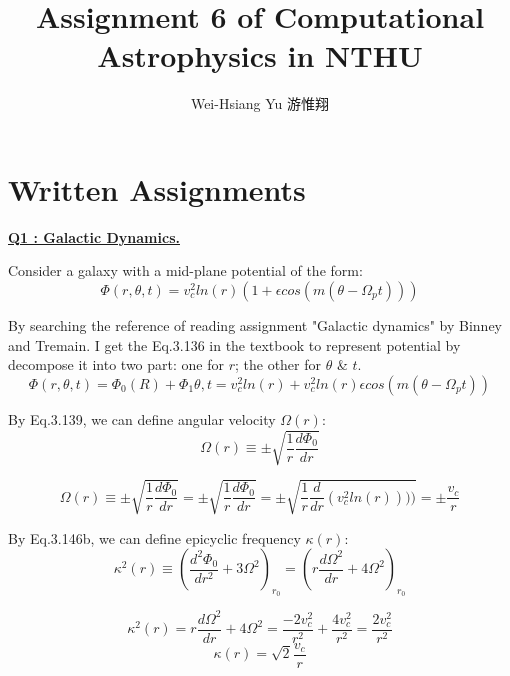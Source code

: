\documentclass{article}
\title{Assignment 6 of Computational Astrophysics in NTHU}
\author{Wei-Hsiang Yu 游惟翔}
\begin{document}
\begin{CJK}{UTF8}{bsmi}
\maketitle
\end{CJK}


\section{Written Assignments}
\underline{\textbf{Q1 : Galactic Dynamics.}}

Consider a galaxy with a mid-plane potential of the form:
\begin{equation}
    \Phi (r,\theta ,t)=v_{c}^{2}ln(r)(1+\epsilon cos(m(\theta -\Omega_{p}t )))
    \label{eq:potential}
\end{equation}

By searching the reference of reading assignment "Galactic dynamics" by Binney and Tremain. I get the Eq.3.136 in the textbook to represent potential by decompose it into two part: one for $r$; the other for $\theta$ \& $t$.
\begin{equation*}
    \Phi (r,\theta ,t)=\Phi_0(R)+\Phi_1{\theta ,t}=v_{c}^{2}ln(r)+v_{c}^{2}ln(r)\epsilon cos(m(\theta -\Omega_{p}t ))
\end{equation*}

By Eq.3.139, we can define angular velocity $\Omega(r)$:
\begin{equation}
    \Omega (r)\equiv \pm \sqrt{{\frac{1}{r}\frac{d\Phi _0}{dr}}}
\end{equation}

$$\Omega (r)\equiv \pm \sqrt{{\frac{1}{r}\frac{d\Phi _0}{dr}}}=\pm \sqrt{{\frac{1}{r}\frac{d\Phi _0}{dr}}}=\pm\sqrt{\frac{1}{r}\frac{d}{dr}(v_c^2ln(r))))}=\pm\frac{v_c}{r}$$

By Eq.3.146b, we can define epicyclic frequency $\kappa(r)$:
\begin{equation}
    \kappa^2(r) \equiv(\frac{d^2\Phi _0}{dr^2}+3\Omega ^2)_{r_0} =(r\frac{d\Omega^2}{dr}+4\Omega ^2)_{r_0}
    \label{eq:kappa}
\end{equation}

$$\kappa^2(r)=r\frac{d\Omega^2}{dr}+4\Omega ^2=\frac{-2v_c^2}{r^2}+\frac{4v_c^2}{r^2}=\frac{2v_c^2}{r^2}$$
$$\kappa(r)=\sqrt{2}\frac{v_c}{r}$$
\end{document}
